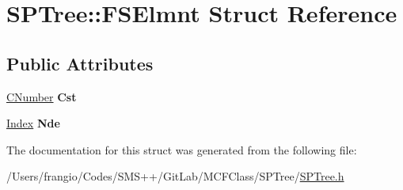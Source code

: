 \hypertarget{struct_s_p_tree_1_1_f_s_elmnt}{}\section{S\+P\+Tree\+:\+:F\+S\+Elmnt Struct Reference}
\label{struct_s_p_tree_1_1_f_s_elmnt}
\subsection*{Public Attributes}
\begin{DoxyCompactItemize}
\item 
\mbox{\label{struct_s_p_tree_1_1_f_s_elmnt_a0c6e26f1ff6d2995fd8b9af7be2b6b51}} 
\mbox{\hyperlink{class_m_c_f_class_a24d0627ba8213afe1ec4ebeb4508e8f1}{C\+Number}} {\bfseries Cst}
\item 
\mbox{\label{struct_s_p_tree_1_1_f_s_elmnt_a4a781b1c7fa2dcc74fd910862f3a3776}} 
\mbox{\hyperlink{class_m_c_f_class_ad53d6229d7ec28555a9c9c2fd9abf773}{Index}} {\bfseries Nde}
\end{DoxyCompactItemize}


The documentation for this struct was generated from the following file\+:\begin{DoxyCompactItemize}
\item 
/\+Users/frangio/\+Codes/\+S\+M\+S++/\+Git\+Lab/\+M\+C\+F\+Class/\+S\+P\+Tree/\mbox{\hyperlink{_s_p_tree_8h}{S\+P\+Tree.\+h}}\end{DoxyCompactItemize}
